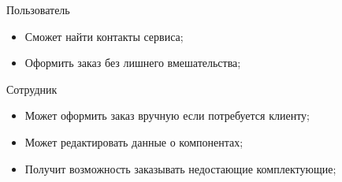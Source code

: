 Пользователь
\begin{itemize}
	\item Сможет найти контакты сервиса;
	\item Оформить заказ без лишнего вмешательства;
\end{itemize}

Сотрудник
\begin{itemize}
	\item Может оформить заказ вручную если потребуется клиенту;
	\item Может редактировать данные о компонентах;
	\item Получит возможность заказывать недостающие комплектующие;
\end{itemize}
